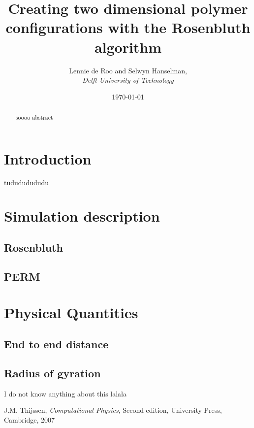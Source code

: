 \documentclass{article}
\begin{document}
\title{\textbf{Creating two dimensional polymer configurations with the Rosenbluth algorithm}}
\author{Lennie de Roo and Selwyn Hanselman, \\
 \emph{Delft University of Technology}}
\date{\normalsize{\today}}
\maketitle 
\hrulefill
\begin{abstract}
{\color{blue}soooo abstract}
\end{abstract}
\hrulefill
\begin{multicols}{2}
\section*{Introduction}
{\color{blue} tudududududu}
 
\section*{Simulation description}

\subsection*{Rosenbluth}

\subsection*{PERM}

\section*{Physical Quantities}

\subsection*{End to end distance}

\subsection*{Radius of gyration}
{\color{blue} I do not know anything about this lalala}


\begin{thebibliography}{9}
 J.M. Thijssen,\emph{ Computational Physics}, Second edition, University Press, Cambridge, 2007
\end{thebibliography}
\end{multicols}
\end{document}
